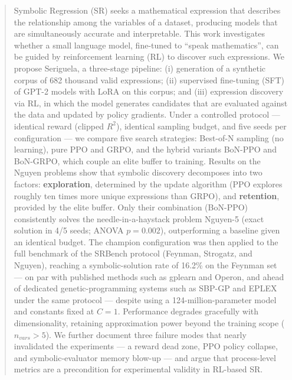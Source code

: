 \documentclass[Ingles, hidelinks]{ic-tese-v3} %
\begin{document}
\begin{abstract}
Symbolic Regression (SR) seeks a mathematical expression that describes the relationship among the variables of a dataset, producing models that are simultaneously accurate and interpretable. This work investigates whether a small language model, fine-tuned to ``speak mathematics'', can be guided by reinforcement learning (RL) to discover such expressions. We propose Seriguela, a three-stage pipeline: (i) generation of a synthetic corpus of 682 thousand valid expressions; (ii) supervised fine-tuning (SFT) of GPT-2 models with LoRA on this corpus; and (iii) expression discovery via RL, in which the model generates candidates that are evaluated against the data and updated by policy gradients. Under a controlled protocol --- identical reward (clipped $R^2$), identical sampling budget, and five seeds per configuration --- we compare five search strategies: Best-of-N sampling (no learning), pure PPO and GRPO, and the hybrid variants BoN-PPO and BoN-GRPO, which couple an elite buffer to training. Results on the Nguyen problems show that symbolic discovery decomposes into two factors: \textbf{exploration}, determined by the update algorithm (PPO explores roughly ten times more unique expressions than GRPO), and \textbf{retention}, provided by the elite buffer. Only their combination (BoN-PPO) consistently solves the needle-in-a-haystack problem Nguyen-5 (exact solution in 4/5 seeds; ANOVA $p=0.002$), outperforming a baseline given an identical budget. The champion configuration was then applied to the full benchmark of the SRBench protocol (Feynman, Strogatz, and Nguyen), reaching a symbolic-solution rate of 16.2\% on the Feynman set --- on par with published methods such as gplearn and Operon, and ahead of dedicated genetic-programming systems such as SBP-GP and EPLEX under the same protocol --- despite using a 124-million-parameter model and constants fixed at $C=1$. Performance degrades gracefully with dimensionality, retaining approximation power beyond the training scope ($n_{vars}>5$). We further document three failure modes that nearly invalidated the experiments --- a reward dead zone, PPO policy collapse, and symbolic-evaluator memory blow-up --- and argue that process-level metrics are a precondition for experimental validity in RL-based SR.
\end{abstract}

\listoffigures
\listoftables

\tableofcontents

\fimdaspaginasiniciais










\begin{appendices}

\end{appendices}
\end{document}
